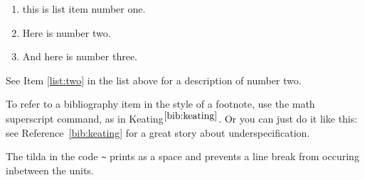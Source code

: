 \documentclass[12pt,twoside,leqno]{article}%
\begin{document}
\begin{enumerate}
\item \label{list:one} this is list item number one.
\item \label{list:two} Here is number two.
\item \label{list:three} And here is number three. 
\end{enumerate}

See Item \ref{list:two} in the list above for a description of number two.


To refer to a bibliography item in the style of a footnote, use the math superscript command, as in Keating$^{\ref{bib:keating}}$. Or you can just do it like this: see Reference~\ref{bib:keating} for a great story about underspecification.

The tilda in the code \verb!~! prints as a space and prevents a line break from occuring inbetween the units.
\end{document}
